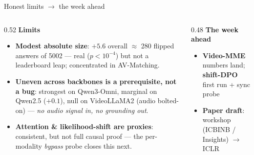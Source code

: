 \documentclass[aspectratio=169,11pt]{beamer}
\begin{document}
\begin{frame}{Honest limits $\to$ the week ahead}
\begin{columns}[T]
\begin{column}{0.52\textwidth}
\textbf{Limits}
\begin{itemize}\footnotesize
\item \textbf{Modest absolute size}: $+5.6$ overall $\approx$ 280 flipped answers of 5002 --- real
($p<10^{-4}$) but not a leaderboard leap; concentrated in AV-Matching.
\item \textbf{Uneven across backbones is a prerequisite, not a bug}: strongest on Qwen3-Omni, marginal on
Qwen2.5 ($+0.1$), null on VideoLLaMA2 (audio bolted-on) --- \emph{no audio signal in, no grounding out}.
\item \textbf{Attention \& likelihood-shift are proxies}: consistent, but not full causal proof ---
the per-modality \emph{bypass} probe closes this next.
\end{itemize}
\end{column}
\begin{column}{0.48\textwidth}
\textbf{The week ahead}
\begin{itemize}\footnotesize
\item \textbf{Video-MME} numbers land; \textbf{shift-DPO} first run + sync probe
\item \textbf{Paper draft}: workshop (ICBINB / Insights) $\to$ ICLR
\end{itemize}
\end{column}
\end{columns}
\end{frame}
\end{document}
